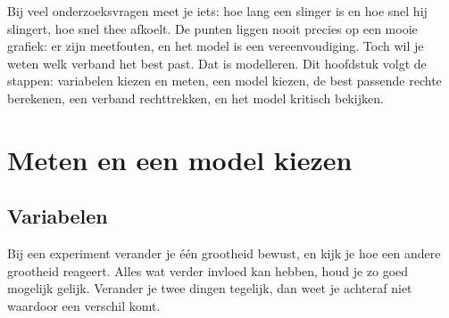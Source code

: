 %



Bij veel onderzoeksvragen meet je iets: hoe lang een slinger is en hoe snel hij slingert, hoe snel thee afkoelt. De punten liggen nooit precies op een mooie grafiek: er zijn meetfouten, en het model is een vereenvoudiging. Toch wil je weten welk verband het best past. Dat is modelleren. Dit hoofdstuk volgt de stappen: variabelen kiezen en meten, een model kiezen, de best passende rechte berekenen, een verband rechttrekken, en het model kritisch bekijken.

\begin{oefeningen}[Start]

\end{oefeningen}

\section{Meten en een model kiezen}

\subsection{Variabelen}\label{sec:h2-variabelen}

Bij een experiment verander je één grootheid bewust, en kijk je hoe een andere grootheid reageert. Alles wat verder invloed kan hebben, houd je zo goed mogelijk gelijk. Verander je twee dingen tegelijk, dan weet je achteraf niet waardoor een verschil komt.

